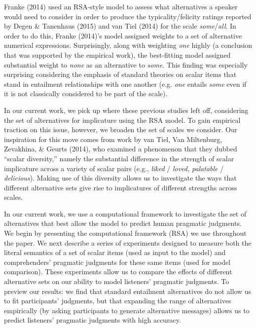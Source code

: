 \documentclass[10pt, letterpaper]{article}
\begin{document}
Franke (2014) used an RSA-style model to assess what alternatives a
speaker would need to consider in order to produce the
typicality/felicity ratings reported by Degen \& Tanenhaus (2015) and
{van Tiel} (2014) for the scale \emph{some}/\emph{all}. In order to do
this, Franke (2014)'s model assigned weights to a set of alternative
numerical expressions. Surprisingly, along with weighting \emph{one}
highly (a conclusion that was supported by the empirical work), the
best-fitting model assigned substantial weight to \emph{none} as an
alternative to \emph{some}. This finding was especially surprising
considering the emphasis of standard theories on scalar items that stand
in entailment relationships with one another (e.g. \emph{one} entails
\emph{some} even if it is not classically considered to be part of the
scale).

In our current work, we pick up where these previous studies left off,
considering the set of alternatives for implicature using the RSA model.
To gain empirical traction on this issue, however, we broaden the set of
scales we consider. Our inspiration for this move comes from work by
{van Tiel}, Van Miltenburg, Zevakhina, \& Geurts (2014), who examined a
phenomenon that they dubbed ``scalar diversity,'' namely the substantial
difference in the strength of scalar implicature across a variety of
scalar pairs (e.g., \emph{liked} / \emph{loved,} \emph{palatable} /
\emph{delicious}). Making use of this diversity allows us to investigate
the ways that different alternative sets give rise to implicatures of
different strengths across scales.

In our current work, we use a computational framework to investigate the
set of alternatives that best allow the model to predict human pragmatic
judgments. We begin by presenting the computational framework (RSA) we
use throughout the paper. We next describe a series of experiments
designed to measure both the literal semantics of a set of scalar items
(used as input to the model) and comprehenders' pragmatic judgments for
these same items (used for model comparison). These experiments allow us
to compare the effects of different alternative sets on our ability to
model listeners' pragmatic judgments. To preview our results: we find
that standard entailment alternatives do not allow us to fit
participants' judgments, but that expanding the range of alternatives
empirically (by asking participants to generate alternative messages)
allows us to predict listeners' pragmatic judgments with high accuracy.
\end{document}
